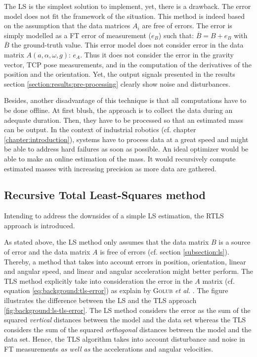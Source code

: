 \documentclass[/home/francois/latex/report/main.tex]{subfiles}
\begin{document}
The \ac{LS} is the simplest solution to implement, yet, there is a drawback. The error model does not fit the framework of the situation. This method is indeed based on the assumption that the data matrices $A_i$ are free of errors. The error is simply modelled as a \ac{FT} error of measurement ($e_B$) such that: $\overline{B} = B + e_B$ with $\overline{B}$ the ground-truth value. This error model does not consider error in the data matrix $A(a, \alpha, \omega, g)$: $e_A$. Thus it does not consider the error in the gravity vector, \ac{TCP} pose measurements, and in the computation of the derivatives of the position and the orientation. Yet, the output signals presented in the results section \ref{section:results:pre-processing} clearly show noise and disturbances.

Besides, another disadvantage of this technique is that all computations have to be done offline. At first blush, the approach is to collect the data during an adequate duration. Then, they have to be processed so that an estimated mass can be output. In the context of industrial robotics (cf. chapter \ref{chapter:introduction}), systems have to process data at a great speed and might be able to address hard failures as soon as possible. An ideal optimizer would be able to make an online estimation of the mass. It would recursively compute estimated masses with increasing precision as more data are gathered.

\subsection{Recursive Total Least-Squares method}

Intending to address the downsides of a simple \ac{LS} estimation, the \ac{RTLS} approach is introduced.

As stated above, the \ac{LS} method only assumes that the data matrix $B$ is a source of error and the data matrix $A$ is free of errors (cf. section \ref{subsection:ls}). Thereby, a method that takes into account errors in position, orientation, linear and angular speed, and linear and angular acceleration might better perform. The \ac{TLS} method explicitly take into consideration the error in the $A$ matrix (cf. equation \ref{eq:background:tls-error}) as explain by \textsc{Golub} \textit{et al.} \cite{Golub1980}. The figure illustrates the difference between the \ac{LS} and the \ac{TLS} approach \ref{fig:background:ls-tls-error}. The \ac{LS} method considers the error as the sum of the squared \textit{vertical} distances between the model and the data set whereas the \ac{TLS} considers the sum of the squared \textit{orthogonal} distances between the model and the data set. Hence, the \ac{TLS} algorithm takes into account disturbance and noise in \ac{FT} measurements \textit{as well as} the accelerations and angular velocities.
\end{document}
